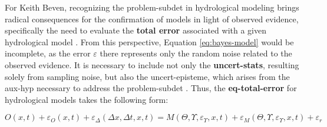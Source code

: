 \documentclass[./main_en.tex]{subfiles}
\begin{document}
\par For Keith Beven, recognizing the \gls{problem-subdet} in hydrological modeling brings radical consequences for the confirmation of models in light of observed evidence, specifically the need to evaluate the \textbf{total error} associated with a given hydrological \gls{model} \cite{Beven2005}. From this perspective, Equation \eqref{eq:bayes-model} would be incomplete, as the error $\varepsilon$ there represents only the random noise related to the observed evidence. It is necessary to include not only the \textbf{\gls{uncert-stats}}, resulting solely from sampling noise, but also the \gls{uncert-episteme}, which arises from the \gls{aux-hyp} necessary to address the \gls{problem-subdet} \cite{Beven2016}. Thus, the \textbf{\gls{eq-total-error}} for hydrological models takes the following form:
\begin{linenomath*}
\begin{equation}
\label{eq:total-error}
    O(x, t) + \varepsilon_{O}(x, t) + \varepsilon_{\Delta}(\Delta x,\Delta t, x, t) = M(\Theta, \Upsilon, \varepsilon_{\Upsilon}, x, t) + \varepsilon_{M}(\Theta, \Upsilon, \varepsilon_{\Upsilon}, x, t) + \varepsilon_r
\end{equation}
\end{linenomath*}
\end{document}
